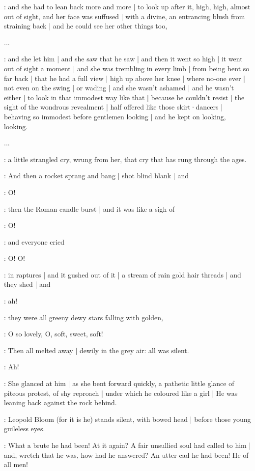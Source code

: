 \gertySex:
and she had to lean back more and more |
to look up after it,
high,
high,
almost out of sight,
and her face was suffused |
with a divine,
an entrancing blush from straining back |
and he could see her other things too,

...

\gertySex:
and she let him |
and she saw that he saw |
and then it went so high |
it went out of sight a moment |
and she was trembling in every limb |
from being bent so far back |
that he had a full view |
high up above her knee |
where no-one ever |
not even on the swing |
or wading |
and she wasn't ashamed |
and he wasn't either |%
to look in that immodest way like that |
because he couldn't resist |
the sight of the wondrous revealment |
half offered like those skirt·dancers |
behaving so immodest before gentlemen looking |
and he kept on looking,
looking.

...

\gertySex:
a little strangled cry,
wrung from her,
that cry
that has rung through the ages.

:
And then a rocket
sprang and bang |
shot blind blank |
and

\gertySex:
O!

:
then the Roman candle burst |
and it was like a sigh of

\gertySex:
O!

:
and everyone cried

\All:
O!
O!

:
in raptures |
and it gushed out of it |
a stream of rain gold hair threads |
and they shed |
and

\All:
ah!

:
they were
all greeny dewy stars falling with golden,%

\gertySex:
O so lovely,
O,
soft,
sweet,
soft!

\Nnovel:
Then all melted away |
dewily in the grey air:
all was silent.

\gertySex:
Ah!

\Nnovel:
She glanced at him |
as she bent forward quickly,
a pathetic little glance of piteous protest,
of shy reproach |
under which he coloured like a girl |
He was leaning back against the rock behind.

:
Leopold Bloom
(for it is he)
stands silent,
with bowed head |
before those young guileless eyes.

\Nnovel:
What a brute he had been!
At it again?
A fair unsullied soul had called to him |
and,
wretch that he was,
how had he answered?
An utter cad
he had been!
He of all men!

